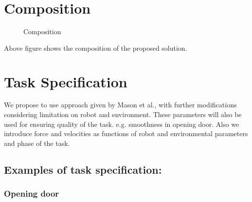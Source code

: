 \documentclass[thesis]{mas_proposal}
\begin{document}
\section{Composition}

\begin{figure}[H]
	\caption{\label{fig:composition} Composition}
\end{figure}
Above figure shows the composition of the proposed solution.

\section{Task Specification}
We propose to use approach given by Mason et al.\cite{mason1981compliance}, with further modifications considering limitation on robot and environment. These parameters will also be used for ensuring quality of the task. e.g. smoothness in opening door. Also we introduce force and velocities as functions of robot and environmental parameters and phase of the task. 

\subsection{Examples of task specification:} 
\subsubsection{Opening door}
\end{document}

